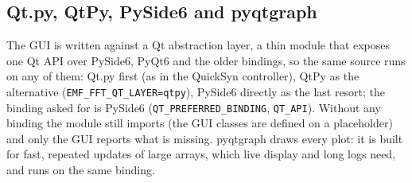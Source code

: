 \documentclass[10pt,letterpaper]{article}
\numberwithin{equation}{section}
\begin{document}
\subsection{Qt.py, QtPy, PySide6 and pyqtgraph}\label{app:qt}
The GUI is written against a Qt abstraction layer, a thin module that exposes
one Qt API over PySide6, PyQt6 and the older bindings, so the same source runs
on any of them: Qt.py \cite{B24} first (as in the QuickSyn controller), QtPy
\cite{B40} as the alternative (\texttt{EMF\_FFT\_QT\_LAYER=qtpy}), PySide6
\cite{B25} directly as the last resort; the binding asked for is PySide6
(\texttt{QT\_PREFERRED\_BINDING}, \texttt{QT\_API}). Without any binding the
module still imports (the GUI classes are defined on a placeholder) and only the
GUI reports what is missing. pyqtgraph \cite{B26} draws every plot: it is built
for fast, repeated updates of large arrays, which live display and long logs
need, and runs on the same binding.
\end{document}
